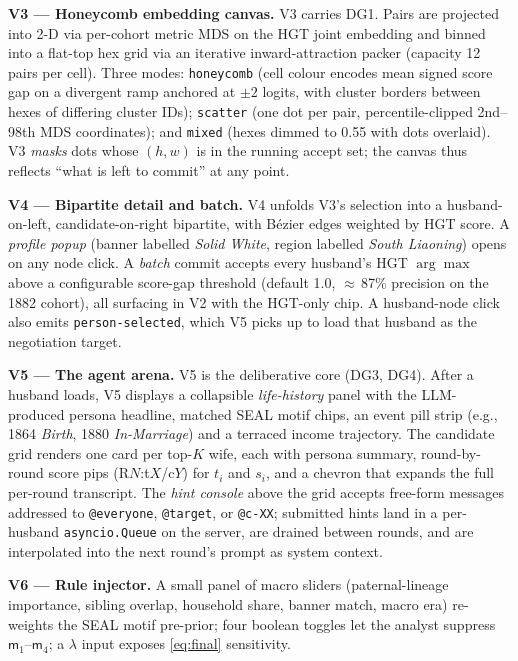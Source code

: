 \documentclass[review]{vgtc}                  %
\begin{document}
\textbf{V3 --- Honeycomb embedding canvas.} V3 carries DG1. Pairs are
projected into 2-D via per-cohort metric MDS on the HGT joint
embedding and binned into a flat-top hex grid via an iterative
inward-attraction packer (capacity 12 pairs per cell). Three modes:
\texttt{honeycomb} (cell colour encodes mean signed score gap on a
divergent ramp anchored at $\pm 2$ logits, with cluster borders
between hexes of differing cluster IDs); \texttt{scatter} (one dot
per pair, percentile-clipped 2nd--98th MDS coordinates); and
\texttt{mixed} (hexes dimmed to 0.55 with dots overlaid). V3
\emph{masks} dots whose $(h, w)$ is in the running accept set; the
canvas thus reflects ``what is left to commit'' at any point.

\textbf{V4 --- Bipartite detail and batch.} V4 unfolds V3's
selection into a husband-on-left, candidate-on-right bipartite, with
B\'ezier edges weighted by HGT score. A \emph{profile popup}
(banner labelled \emph{Solid White}, region labelled
\emph{South Liaoning}) opens on any node click. A \emph{batch}
commit accepts every husband's HGT $\arg\max$ above a configurable
score-gap threshold (default 1.0, $\approx$\,87\% precision on the
1882 cohort), all surfacing in V2 with the \textsf{HGT}-only chip.
A husband-node click also emits \texttt{person-selected}, which V5
picks up to load that husband as the negotiation target.

\textbf{V5 --- The agent arena.} V5 is the deliberative core (DG3,
DG4). After a husband loads, V5 displays a collapsible
\emph{life-history} panel with the LLM-produced persona headline,
matched SEAL motif chips, an event pill strip (e.g., 1864
\emph{Birth}, 1880 \emph{In-Marriage}) and a terraced income
trajectory. The candidate grid renders one card per top-$K$ wife,
each with persona summary, round-by-round score pips
(\textsf{R$N$:t$X$/c$Y$}) for $t_i$ and $s_i$, and a chevron that
expands the full per-round transcript. The \emph{hint console}
above the grid accepts free-form messages addressed to
\texttt{@everyone}, \texttt{@target}, or \texttt{@c-XX}; submitted
hints land in a per-husband \texttt{asyncio.Queue} on the server,
are drained between rounds, and are interpolated into the next
round's prompt as system context.

\textbf{V6 --- Rule injector.} A small panel of macro sliders
(paternal-lineage importance, sibling overlap, household share,
banner match, macro era) re-weights the SEAL motif pre-prior; four
boolean toggles let the analyst suppress
$\mathsf{m}_1$--$\mathsf{m}_4$; a $\lambda$ input exposes
\cref{eq:final} sensitivity.
\end{document}
